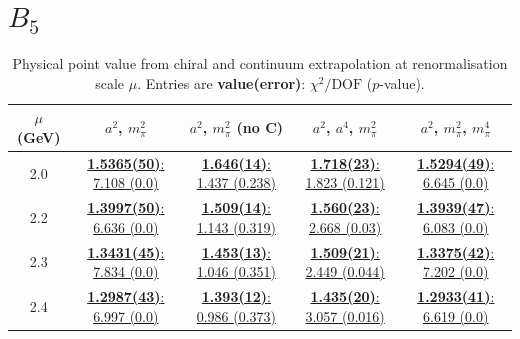 \documentclass[12pt]{extarticle}
\begin{document}
\section{$B_5$}
\begin{table}[h!]
\begin{center}
\begin{tabular}{|c|c|c|c|c|}
\hline
$\mu$ (GeV) & $a^2$, $m_\pi^2$& $a^2$, $m_\pi^2$ (no C)& $a^2$, $a^4$, $m_\pi^2$& $a^2$, $m_\pi^2$, $m_\pi^4$\\
\hline
2.0& \hyperlink{TT/NPR/a2m2_20.pdf.1}{\textbf{1.5365(50)}: 7.108 (0.0)} & \hyperlink{TT/NPR/a2m2noC_20.pdf.1}{\textbf{1.646(14)}: 1.437 (0.238)} & \hyperlink{TT/NPR/a2a4m2_20.pdf.1}{\textbf{1.718(23)}: 1.823 (0.121)} & \hyperlink{TT/NPR/a2m2m4_20.pdf.1}{\textbf{1.5294(49)}: 6.645 (0.0)}\\
2.2& \hyperlink{TT/NPR/a2m2_22.pdf.1}{\textbf{1.3997(50)}: 6.636 (0.0)} & \hyperlink{TT/NPR/a2m2noC_22.pdf.1}{\textbf{1.509(14)}: 1.143 (0.319)} & \hyperlink{TT/NPR/a2a4m2_22.pdf.1}{\textbf{1.560(23)}: 2.668 (0.03)} & \hyperlink{TT/NPR/a2m2m4_22.pdf.1}{\textbf{1.3939(47)}: 6.083 (0.0)}\\
2.3& \hyperlink{TT/NPR/a2m2_23.pdf.1}{\textbf{1.3431(45)}: 7.834 (0.0)} & \hyperlink{TT/NPR/a2m2noC_23.pdf.1}{\textbf{1.453(13)}: 1.046 (0.351)} & \hyperlink{TT/NPR/a2a4m2_23.pdf.1}{\textbf{1.509(21)}: 2.449 (0.044)} & \hyperlink{TT/NPR/a2m2m4_23.pdf.1}{\textbf{1.3375(42)}: 7.202 (0.0)}\\
2.4& \hyperlink{TT/NPR/a2m2_24.pdf.1}{\textbf{1.2987(43)}: 6.997 (0.0)} & \hyperlink{TT/NPR/a2m2noC_24.pdf.1}{\textbf{1.393(12)}: 0.986 (0.373)} & \hyperlink{TT/NPR/a2a4m2_24.pdf.1}{\textbf{1.435(20)}: 3.057 (0.016)} & \hyperlink{TT/NPR/a2m2m4_24.pdf.1}{\textbf{1.2933(41)}: 6.619 (0.0)}\\
\hline
\end{tabular}
\caption{Physical point value from chiral and continuum extrapolation at renormalisation scale $\mu$. Entries are \textbf{value(error)}: $\chi^2/\text{DOF}$ ($p$-value).}
\end{center}
\end{table}
\end{document}
